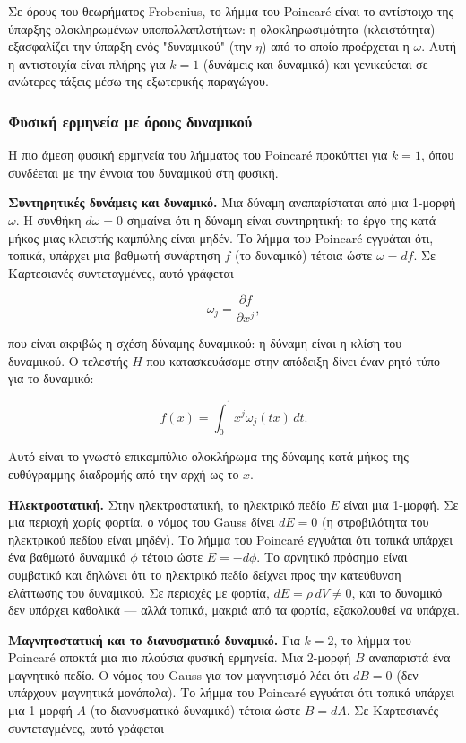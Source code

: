 \documentclass[12pt]{article}
\begin{document}
Σε όρους του θεωρήματος Frobenius, το λήμμα του Poincaré είναι το αντίστοιχο της ύπαρξης ολοκληρωμένων υποπολλαπλοτήτων: η ολοκληρωσιμότητα (κλειστότητα) εξασφαλίζει την ύπαρξη ενός "δυναμικού" (την $\eta$) από το οποίο προέρχεται η $\omega$. Αυτή η αντιστοιχία είναι πλήρης για $k=1$ (δυνάμεις και δυναμικά) και γενικεύεται σε ανώτερες τάξεις μέσω της εξωτερικής παραγώγου.

\subsubsection{Φυσική ερμηνεία με όρους δυναμικού}

Η πιο άμεση φυσική ερμηνεία του λήμματος του Poincaré προκύπτει για $k=1$, όπου συνδέεται με την έννοια του δυναμικού στη φυσική.

\textbf{Συντηρητικές δυνάμεις και δυναμικό.} Μια δύναμη αναπαρίσταται από μια 1-μορφή $\omega$. Η συνθήκη $d\omega = 0$ σημαίνει ότι η δύναμη είναι συντηρητική: το έργο της κατά μήκος μιας κλειστής καμπύλης είναι μηδέν. Το λήμμα του Poincaré εγγυάται ότι, τοπικά, υπάρχει μια βαθμωτή συνάρτηση $f$ (το δυναμικό) τέτοια ώστε $\omega = df$. Σε Καρτεσιανές συντεταγμένες, αυτό γράφεται

\[
\omega_j = \frac{\partial f}{\partial x^j},
\]

που είναι ακριβώς η σχέση δύναμης-δυναμικού: η δύναμη είναι η κλίση του δυναμικού. Ο τελεστής $H$ που κατασκευάσαμε στην απόδειξη δίνει έναν ρητό τύπο για το δυναμικό:

\[
f(x) = \int_0^1 x^j \omega_j(tx) \, dt.
\]

Αυτό είναι το γνωστό επικαμπύλιο ολοκλήρωμα της δύναμης κατά μήκος της ευθύγραμμης διαδρομής από την αρχή ως το $x$.

\textbf{Ηλεκτροστατική.} Στην ηλεκτροστατική, το ηλεκτρικό πεδίο $E$ είναι μια 1-μορφή. Σε μια περιοχή χωρίς φορτία, ο νόμος του Gauss δίνει $dE = 0$ (η στροβιλότητα του ηλεκτρικού πεδίου είναι μηδέν). Το λήμμα του Poincaré εγγυάται ότι τοπικά υπάρχει ένα βαθμωτό δυναμικό $\phi$ τέτοιο ώστε $E = -d\phi$. Το αρνητικό πρόσημο είναι συμβατικό και δηλώνει ότι το ηλεκτρικό πεδίο δείχνει προς την κατεύθυνση ελάττωσης του δυναμικού. Σε περιοχές με φορτία, $dE = \rho \, dV \neq 0$, και το δυναμικό δεν υπάρχει καθολικά — αλλά τοπικά, μακριά από τα φορτία, εξακολουθεί να υπάρχει.

\textbf{Μαγνητοστατική και το διανυσματικό δυναμικό.} Για $k=2$, το λήμμα του Poincaré αποκτά μια πιο πλούσια φυσική ερμηνεία. Μια 2-μορφή $B$ αναπαριστά ένα μαγνητικό πεδίο. Ο νόμος του Gauss για τον μαγνητισμό λέει ότι $dB = 0$ (δεν υπάρχουν μαγνητικά μονόπολα). Το λήμμα του Poincaré εγγυάται ότι τοπικά υπάρχει μια 1-μορφή $A$ (το διανυσματικό δυναμικό) τέτοια ώστε $B = dA$. Σε Καρτεσιανές συντεταγμένες, αυτό γράφεται
\end{document}
